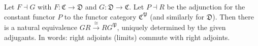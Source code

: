 Let $F \dashv G$ with $F: \mathfrak{C} \to \mathfrak{D}$ and $G: \mathfrak{D} \to \mathfrak{C}$. Let $P \dashv R$ be the adjunction for the constant functor $P$ to the functor category $\mathfrak{C}^{\mathfrak{P}}$ (and similarly for $\mathfrak{D}$). Then there is a natural equivalence $G R \xrightarrow{\cong} R G^{\mathfrak{P}}$, uniquely determined by the given adjugants. In words: right adjoints (limits) commute with right adjoints.
